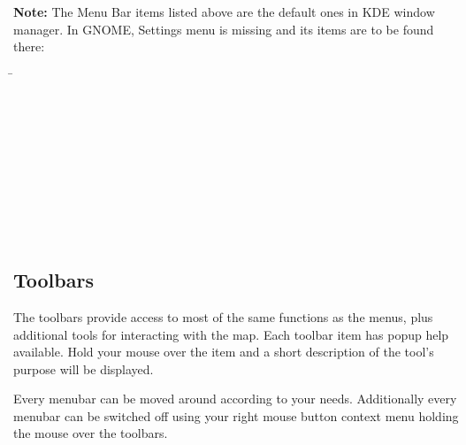 \textbf{Note:} \nix The Menu Bar items listed above are the default ones in KDE window
manager. In GNOME, Settings menu is missing and its items are to be found
there:
\begin{tabbing}
 \hspace{3cm}\=
 \\
 \hspace{3cm}\>
\\
 \hspace{3cm}\>
\\
 \hspace{3cm}\>
\\
\hspace{3cm}\>
 \\
 \hspace{3cm}\>
 \\
   \hspace{3cm}\>
 \\
 \hspace{3cm}\>
 \\
 \hspace{3cm}\>
 \\
 \hspace{3cm}\>
 \\
\end{tabbing}


\subsection{Toolbars}\label{label_toolbars}

The toolbars provide access to most of the same functions as the menus,
plus additional tools for interacting with the map. Each toolbar item has
popup help available. Hold your mouse over the item and a short description of
the tool's purpose will be displayed.

Every menubar can be moved around according to your needs. Additionally every
menubar can be switched off using your right mouse button context menu holding
the mouse over the toolbars.


